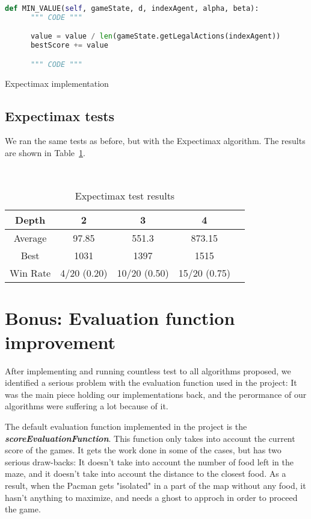 \documentclass{article}
\begin{document}
\begin{table}[!ht]
  \begin{lstlisting}[language=python, frame=tlbr, framesep=6pt, backgroundcolor=\color{light-gray}]
    def MIN_VALUE(self, gameState, d, indexAgent, alpha, beta):
      """ CODE """

      value = value / len(gameState.getLegalActions(indexAgent))
      bestScore += value

      """ CODE """
  \end{lstlisting}
  \caption{Expectimax implementation}
\end{table}

\subsection{Expectimax tests}

We ran the same tests as before, but with the Expectimax algorithm. The results are shown in Table~\ref{tab:expectimax}.

~\\
\begin{table}[!ht]
  \begin{center}
    \begin{tabular}{||c||c|c|c|c||}
      \hline
      Depth & 2 & 3 & 4 \\
      \hline\hline
      Average & 97.85 & 551.3 & 873.15 \\
      \hline\hline
      Best & 1031 & 1397 & 1515 \\
      \hline\hline
      Win Rate & 4/20 (0.20) & 10/20 (0.50) & 15/20 (0.75) \\
      \hline
    \end{tabular}
    \caption{Expectimax test results}
    \label{tab:expectimax}
  \end{center}
\end{table}

\pagebreak
\section{Bonus: Evaluation function improvement}

After implementing and running countless test to all algorithms proposed, we identified a serious problem with the evaluation function used in the project: It was the main piece holding our implementations back, and the perormance of our algorithms were suffering a lot because of it.

The default evaluation function implemented in the project is the \textit{\textbf{scoreEvaluationFunction}}. This function only takes into account the current score of the games. It gets the work done in some of the cases, but has two serious draw-backs: It doesn't take into account the number of food left in the maze, and it doesn't take into account the distance to the closest food. As a result, when the Pacman gets "isolated" in a part of the map without any food, it hasn't anything to maximize, and needs a ghost to approch in order to proceed the game.
\end{document}
